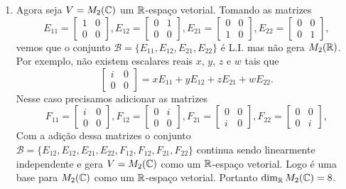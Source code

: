 \begin{exemplos}
\begin{enumerate}
    \item Agora seja $V = M_2(\mathbb{C})$ um $\mathbb{R}$-espaço vetorial. Tomando as matrizes
      \[
        E_{11} = \begin{bmatrix}1 & 0\\0 & 0\end{bmatrix},
        E_{12} = \begin{bmatrix}0 & 1\\0 & 0\end{bmatrix},
        E_{21} = \begin{bmatrix}0 & 0\\1 & 0\end{bmatrix},
        E_{22} = \begin{bmatrix}0 & 0\\0 & 1\end{bmatrix},
      \]
      vemos que o conjunto $\mathcal{B} = \{E_{11}, E_{12}, E_{21}, E_{22}\}$ é L.I. mas não gera $M_2(\mathbb{R})$. Por exemplo, não existem escalares reais $x$, $y$, $z$ e $w$ tais que
      \[
        \begin{bmatrix}i & 0 \\0 & 0\end{bmatrix} = xE_{11} + yE_{12} + zE_{21} + wE_{22}.
      \]
      Nesse caso precisamos adicionar as matrizes
      \[
        F_{11} = \begin{bmatrix}i & 0\\0 & 0\end{bmatrix},
        F_{12} = \begin{bmatrix}0 & i\\0 & 0\end{bmatrix},
        F_{21} = \begin{bmatrix}0 & 0\\i & 0\end{bmatrix},
        F_{22} = \begin{bmatrix}0 & 0\\0 & i\end{bmatrix},
      \]
      Com a adição dessa matrizes o conjunto $\mathcal{B} = \{E_{12}, E_{12}, E_{21}, E_{22}, F_{12}, F_{12}, F_{21}, F_{22}\}$ continua sendo linearmente independente e gera $V = M_2(\mathbb{C})$
      como um $\mathbb{R}$-espaço vetorial. Logo é uma base para $M_2(\mathbb{C})$ como um $\mathbb{R}$-espaço vetorial. Portanto $\dim_{\mathbb{R}} M_2(\mathbb{C}) = 8$.


\end{enumerate}
\end{exemplos}
